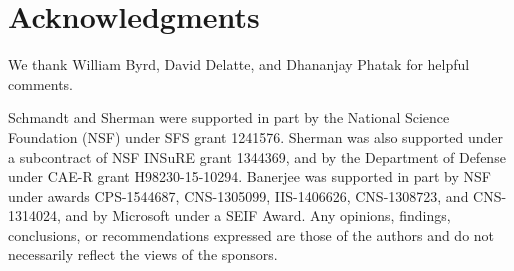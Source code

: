 \section{Acknowledgments}


We thank William Byrd, David Delatte, and Dhananjay Phatak 
for helpful comments.

Schmandt and Sherman were supported in part by the 
National Science Foundation (NSF) under SFS grant 1241576. 
Sherman was also supported under a subcontract of NSF INSuRE grant 1344369, 
and by the Department of Defense under CAE-R grant H98230-15-10294.
Banerjee was supported in part by NSF under awards 
CPS-1544687, CNS-1305099, IIS-1406626, CNS-1308723, and CNS-1314024, 
and by Microsoft under a SEIF Award.
Any opinions, findings, conclusions, or recommendations expressed 
are those of the authors and do not necessarily reflect the views
of the sponsors.